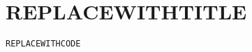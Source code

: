 \documentclass{article}
\begin{document}
\centering
\section*{REPLACEWITHTITLE}

\fontsize{FONTSIZE}{SKIPSIZE}\selectfont

\begin{lstlisting}
REPLACEWITHCODE
\end{lstlisting}
\end{document}
